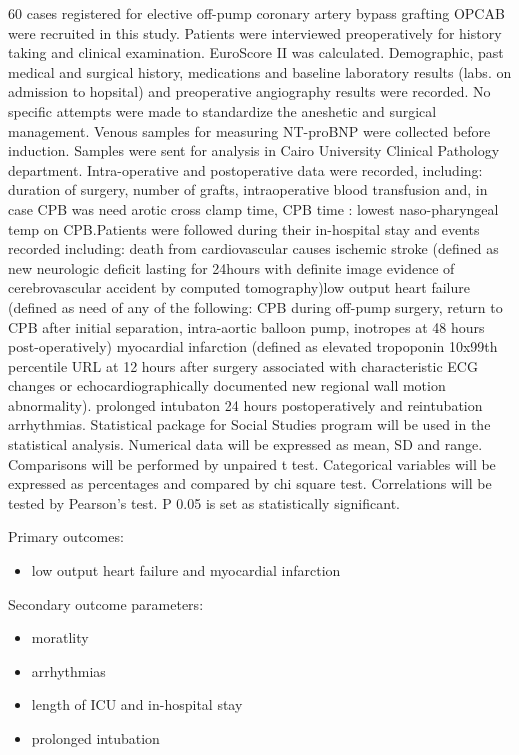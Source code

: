 \documentclass[12pt,a4paper,onecolumn]{article}
\begin{document}
60 cases registered for elective off-pump coronary artery bypass grafting OPCAB were recruited in this study. Patients were interviewed preoperatively for history taking and clinical examination. EuroScore II was calculated. Demographic, past medical and surgical history, medications and baseline laboratory results (labs. on admission to hopsital) and preoperative angiography results were recorded.  No specific attempts were made to standardize the aneshetic and surgical management.  Venous samples for measuring NT-proBNP were collected before induction. Samples were sent for analysis in Cairo University Clinical Pathology department. Intra-operative and postoperative data were recorded, including: duration of surgery, number of grafts, intraoperative blood transfusion and, in case CPB was need arotic cross clamp time, CPB time : lowest naso-pharyngeal temp on CPB.Patients were followed during their in-hospital stay and events recorded including: death from cardiovascular causes ischemic stroke (defined as new neurologic deficit lasting for  24hours with definite image evidence of cerebrovascular accident by computed tomography)low output heart failure (defined as need of any of the following: CPB during off-pump surgery, return to CPB after initial separation, intra-aortic balloon pump, inotropes at 48 hours post-operatively) myocardial infarction (defined as elevated tropoponin 10x99th percentile URL at 12 hours after surgery associated with characteristic ECG changes or echocardiographically documented new regional wall motion abnormality). prolonged intubaton  24 hours postoperatively and reintubation arrhythmias.  Statistical package for Social Studies program will be used in the statistical analysis. Numerical data will be expressed as mean, SD and range. Comparisons will be performed by unpaired t test. Categorical variables will be expressed as percentages and compared by chi square test. Correlations will be tested by Pearson's test. P  0.05 is set as statistically significant.

Primary outcomes:
    \begin{itemize}
        \item low output heart failure and myocardial infarction
    \end{itemize}

Secondary outcome parameters:
    \begin{itemize}
        \item moratlity
        \item arrhythmias
        \item length of ICU and in-hospital stay
        \item prolonged intubation
    \end{itemize}
\end{document}
